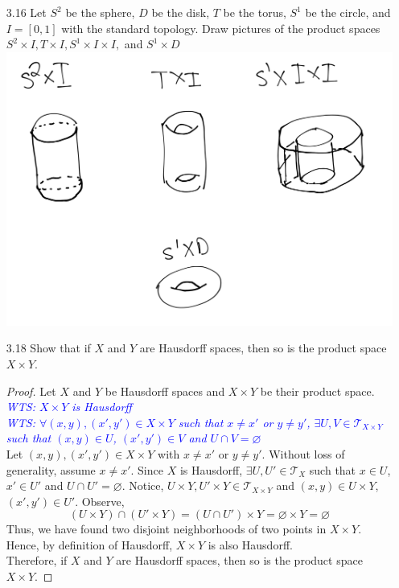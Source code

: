 \documentclass[12pt]{article}
\newcommand{\TT}{\mathcal{T}}
\newcommand{\wts}[1]{\textit{\textcolor{blue}{WTS: #1}}\\}
\begin{document}
\begin{enumerate}
		\item[3.16] Let $S^{2}$ be the sphere, $D$ be the disk, $T$ be the torus, $S^{1}$ be the circle, and $I=[0,1]$ with the standard topology. Draw pictures of the product spaces $S^{2} \times I, T \times I, S^{1} \times I \times I,$ and $S^{1} \times D$\\
		\includegraphics[scale=.12]{3.16.png}
		\item[3.18] Show that if $X$ and $Y$ are Hausdorff spaces, then so is the product space $X \times Y$.
		\begin{proof}
			Let $ X $ and $ Y $ be Hausdorff spaces and $ X\times Y $ be their product space.\\
			\wts{$ X\times Y $ is Hausdorff}
			\wts{$ \forall (x,y),(x',y') \in X\times Y $ such that $ x\not=x' $ or $ y\not=y' $, $ \exists U,V\in\TT_{X\times Y}$ such that $ (x,y)\in U $, $ (x',y')\in V $ and $ U\cap V=\varnothing $}
			Let $ (x,y),(x',y')\in X\times Y $ with $ x\not=x' $ or $ y\not=y'$. Without loss of generality, assume $ x\not=x' $. Since $ X $ is Hausdorff, $ \exists U,U'\in \TT_X $ such that $ x\in U $, $ x'\in U' $ and $ U\cap U' =\varnothing $. Notice, $ U\times Y, U'\times Y \in \TT_{X\times Y}$ and $ (x,y)\in U\times Y $, $ (x',y')\in U' $. Observe,
			\[(U\times Y)\cap(U'\times Y) = (U\cap U')\times Y = \varnothing \times Y = \varnothing  \]
			Thus, we have found two disjoint neighborhoods of two points in $ X\times Y $.\\
			Hence, by definition of Hausdorff, $ X\times Y $ is also Hausdorff.\\
			Therefore, if $X$ and $Y$ are Hausdorff spaces, then so is the product space $X \times Y$.
		\end{proof}
		

\end{enumerate}
\end{document}
